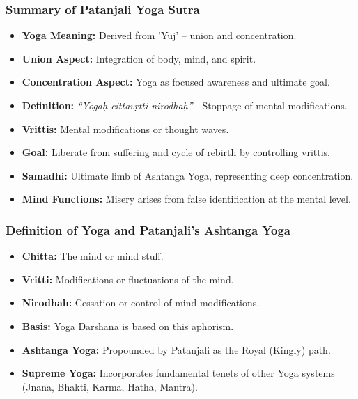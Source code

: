 \begin{frame}[fragile]\frametitle{Summary of Patanjali Yoga Sutra}

    \begin{itemize}
        \item \textbf{Yoga Meaning:} Derived from 'Yuj' – union and concentration.
        \item \textbf{Union Aspect:} Integration of body, mind, and spirit.
        \item \textbf{Concentration Aspect:} Yoga as focused awareness and ultimate goal.
        \item \textbf{Definition:} \textit{“Yogaḥ cittavṛtti nirodhaḥ”} - Stoppage of mental modifications.
        \item \textbf{Vrittis:} Mental modifications or thought waves.
        \item \textbf{Goal:} Liberate from suffering and cycle of rebirth by controlling vrittis.
        \item \textbf{Samadhi:} Ultimate limb of Ashtanga Yoga, representing deep concentration.
        \item \textbf{Mind Functions:} Misery arises from false identification at the mental level.
    \end{itemize}

\end{frame}

\begin{frame}[fragile]\frametitle{Definition of Yoga and Patanjali's Ashtanga Yoga}

    \begin{itemize}
        \item \textbf{Chitta:} The mind or mind stuff.
        \item \textbf{Vritti:} Modifications or fluctuations of the mind.
        \item \textbf{Nirodhah:} Cessation or control of mind modifications.
        \item \textbf{Basis:} Yoga Darshana is based on this aphorism.
        \item \textbf{Ashtanga Yoga:} Propounded by Patanjali as the Royal (Kingly) path.
        \item \textbf{Supreme Yoga:} Incorporates fundamental tenets of other Yoga systems (Jnana, Bhakti, Karma, Hatha, Mantra).
    \end{itemize}

\end{frame}

